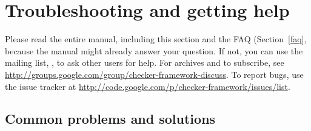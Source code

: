 \section{Troubleshooting and getting help\label{troubleshooting}}

Please read the entire manual, including this section and the FAQ
(Section~\ref{faq}, because the manual might already answer your question.
If not, you can use the mailing list,
, to ask other users for
help.  For archives and to subscribe, see \url{http://groups.google.com/group/checker-framework-discuss}.
To report bugs, use the issue tracker at
\url{http://code.google.com/p/checker-framework/issues/list}.


\subsection{Common problems and solutions\label{common-problems}}


